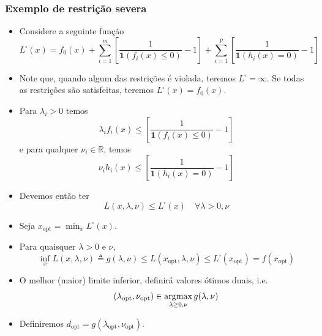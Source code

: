 \begin{frame}[allowframebreaks]
  \frametitle{Exemplo de restrição severa}
  \begin{itemize}
  \item Considere a seguinte função
	\begin{equation}
	L^{\square}(x) = f_0 (x) + \sum_{i=1}^{m} \left[ \frac{1}{\mathbf{1} (f_i(x) \leq 0)} - 1 \right] 
			+ \sum_{i=1}^{p} \left[ \frac{1}{\mathbf{1} (h_i(x) = 0) } - 1 \right]
	\end{equation}
  \item Note que, quando algum das restrições é violada, teremos $L^{\square} = \infty$. Se todas as
	restrições são satisfeitas, teremos $L^{\square} (x) = f_0 (x)$.
  \item Para $\lambda_i > 0$ temos
	\begin{equation}
	\lambda_i f_i (x) \leq \left[ \frac{1}{\mathbf{1} (f_i(x) \leq 0)} - 1 \right]
	\end{equation}
	e para qualquer $\nu_i \in \mathbb{R}$, temos
	\begin{equation}
	\nu_i h_i (x) \leq \left[ \frac{1}{\mathbf{1} (h_i(x) = 0) } - 1 \right]
	\end{equation}
  \item Devemos então ter
	\begin{equation}
	L(x, \lambda, \nu) \leq L^{\square}(x) \quad \forall \lambda > 0, \nu
	\end{equation}
  \item Seja $x_{\text{opt}} = \min_x L^{\square}(x)$.
  \item Para quaisquer $\lambda > 0$ e $\nu$,
	\begin{equation}
	\inf_x L(x, \lambda, \nu) \triangleq g(\lambda, \nu) \leq L(x_{\text{opt}}, \lambda, \nu) \leq L^{\square}(x_{\text{opt}}) = f(x_{\text{opt}})
	\end{equation}
  \item O melhor (maior) limite inferior, definirá valores ótimos duais, i.e.
	\begin{equation}
	(\lambda_{\text{opt}}, \nu_{\text{opt}}) \in \operatorname*{\arg\!\max}_{\lambda \geq 0 , \nu} g(\lambda, \nu)
	\end{equation}
  \item Definiremos $d_{\text{opt}} = g(\lambda_{\text{opt}}, \nu_{\text{opt}})$.
  \end{itemize}
\end{frame}


